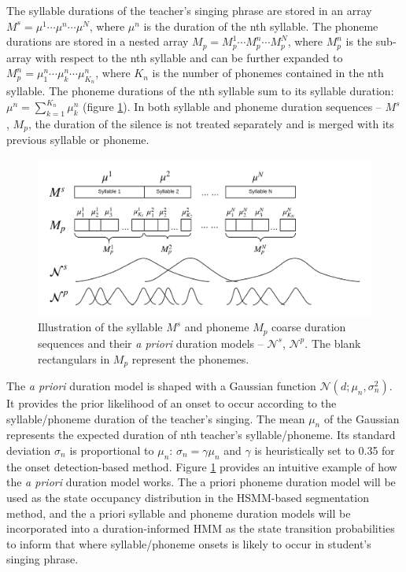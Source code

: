 The syllable durations of the teacher's singing phrase are stored in an array $M^s=\mu^{1} \cdots \mu^{n} \cdots \mu^{N}$, where $\mu^{n}$ is the duration of the nth syllable. The phoneme durations are stored in a nested array $M_p=M^{1}_p \cdots M^{n}_p \cdots M^{N}_p$, where $M^{n}_p$ is the sub-array with respect to the nth syllable and can be further expanded to $M^{n}_p=\mu_{1}^{n} \cdots \mu_{k}^{n} \cdots \mu_{K_{n}}^{n}$, where $K_{n}$ is the number of phonemes contained in the nth syllable. The phoneme durations of the nth syllable sum to its syllable duration: $\mu^{n}=\sum_{k=1}^{K_{n}} \mu_k^{n}$ (figure \ref{fig:coarse_dur}). In both syllable and phoneme duration sequences -- $M^s$, $M_p$, the duration of the silence is not treated separately and is merged with its previous syllable or phoneme.

\begin{figure}[ht!]
    \centering
    \includegraphics[width=\textwidth]{figs/blockDiags_rong/ch5_coarse_durations_segmentation.png}
    \caption{Illustration of the syllable $M^s$ and phoneme $M_p$ coarse duration sequences and their \textit{a priori} duration models -- $\mathcal{N}^s$, $\mathcal{N}^p$. The blank rectangulars in $M_p$ represent the phonemes.}
    \label{fig:coarse_dur}
\end{figure}

The \textit{a priori} duration model is shaped with a Gaussian function $\mathcal{N} (d; {\mu}_n, \sigma_n^2)$. It provides the prior likelihood of an onset to occur according to the syllable/phoneme duration of the teacher's singing. The mean ${\mu}_n$ of the Gaussian represents the expected duration of nth teacher's syllable/phoneme. Its standard deviation $\sigma_n$ is proportional to $\mu_n$: $\sigma_n=\gamma \mu_n$ and $\gamma$ is heuristically set to 0.35 for the onset detection-based method. Figure \ref{fig:coarse_dur} provides an intuitive example of how the \textit{a priori} duration model works. The a priori phoneme duration model will be used as the state occupancy distribution in the \gls{HSMM}-based segmentation method, and the a priori syllable and phoneme duration models will be incorporated into a duration-informed \gls{HMM} as the state transition probabilities to inform that where syllable/phoneme onsets is likely to occur in student's singing phrase.

